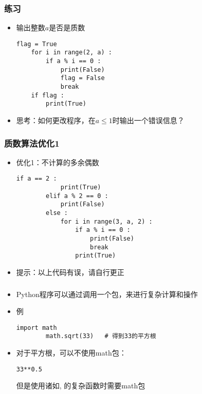 \begin{CJK}{UTF8}{gbsn}
\begin{frame} [fragile]
	\frametitle{练习}
	\linespread{1.25}
	\begin{itemize}
	\item 输出整数$a$是否是质数
	\begin{lstlisting}[style=pythonstyle, gobble=4]
	flag = True
	for i in range(2, a) :
		if a % i == 0 :
			print(False)
			flag = False
			break
	if flag :
		print(True)
	\end{lstlisting}
	\item 思考：如何更改程序，在$a \le 1$时输出一个错误信息？
	\end{itemize}
\end{frame}

\begin{frame} [fragile]
	\frametitle{质数算法优化1}
	\linespread{1.25}
	\begin{itemize}
	\item 优化1：不计算的多余偶数
		\begin{lstlisting}[style=pythonstyle, gobble=8]
		if a == 2 :
			print(True)
		elif a % 2 == 0 :
			print(False)
		else :
			for i in range(3, a, 2) :
				if a % i == 0 :
					print(False)
					break
				print(True)
		\end{lstlisting}
	\item 提示：以上代码有误，请自行更正
	\end{itemize}
\end{frame}

\begin{frame} [fragile]
	\frametitle{}
	\linespread{1.25}
	\begin{itemize}
	\item Python程序可以通过调用一个包，来进行复杂计算和操作
	\item 例
		\begin{lstlisting}[style=pythonstyle, gobble=8, texcl]
		import math
		math.sqrt(33)	# 得到33的平方根
		\end{lstlisting}
	\item 对于平方根，可以不使用math包：
		\begin{lstlisting}[style=pythonstyle, gobble=8]
		33**0.5
		\end{lstlisting}
		但是使用诸如, 的复杂函数时需要math包
	\end{itemize}
\end{frame}


\end{CJK}
